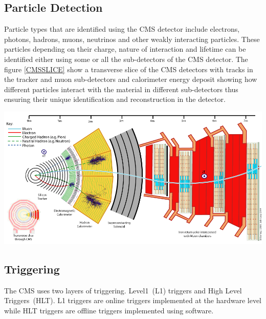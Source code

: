 \subsection{Particle Detection}
Particle types that are identified using the CMS detector include electrons, photons, hadrons, muons, neutrinos and other weakly interacting particles. These particles depending on their charge, nature of interaction and lifetime can be identified either using some or all the sub-detectors of the CMS detector.
The figure \eqref{CMSSLICE} show a  transverse slice of the CMS detectors with tracks in the tracker and muon sub-detectors and calorimeter energy deposit showing how different particles interact with the material in different sub-detectors thus ensuring their unique identification and reconstruction in the detector.

\begin{center}\label{CMSSLICE}
\centering
\mbox{\includegraphics[scale=0.4]{THESISPLOTS/CMS_Slice.png}} 
\label{fig:CMS SLICE}
\end{center}


\subsection{Triggering}
The CMS uses two layers of triggering. Level1~(L1) triggers and High Level Triggers~(HLT). L1 triggers are online triggers implemented at the hardware level while HLT triggers are offline triggers implemented using software. 




\label{Collider_And_Detector_chapter}
